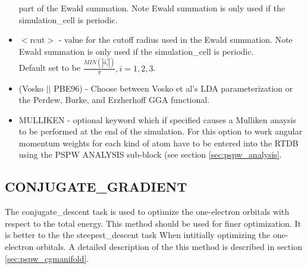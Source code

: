\begin{itemize}
                          part of the Ewald summation.  Note Ewald summation
                          is only used if the simulation\_cell is periodic.
        \item $<$rcut$>$ - value for the cutoff radius used
                          in the Ewald summation.  Note Ewald summation
                          is only used if the simulation\_cell is periodic. \\
                          Default set to be
                          $\frac{MIN(\left| \vec{a_i} \right|)}{\pi}, i=1,2,3$.
        \item (Vosko $||$ PBE96) - Choose between Vosko et al's LDA 
                               parameterization or the Perdew, Burke, 
                               and Erzherhoff GGA functional.
        \item MULLIKEN - optional keyword which if specified
                         causes a Mulliken anaysis to be performed at
                         the end of the simulation.  For this option
                         to work angular momentum weights for each kind
                         of atom have to be entered into the RTDB using
                         the PSPW ANALYSIS sub-block (see section \ref{sec:pspw_analysis}.
\end{itemize}


\subsection{CONJUGATE\_GRADIENT} 

The conjugate\_descent task is used to optimize the one-electron orbitals
with respect to the total energy.  This method should be used for finer
optimization. It is better to the the steepest\_descent task When intitially 
optimizing the one-electron orbitals.  A detailed description of the this method
is described in section \ref{sec:pspw_cgmanifold}.


